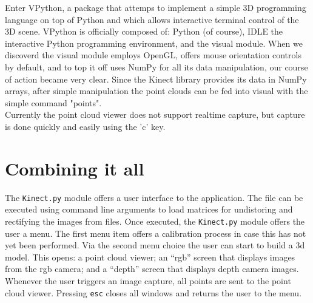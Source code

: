 Enter VPython, a package that attemps to implement a simple 3D programming
language on top of Python and which allows interactive terminal control of the
3D scene. VPython is officially composed of: Python (of course), IDLE the
interactive Python programming environment, and the visual module. When we
discoverd the visual module employs OpenGL, offers mouse orientation controls by
default, and to top it off uses NumPy for all its data manipulation, our course
of action became very clear. Since the Kinect library provides its data in NumPy
arrays, after simple manipulation the point clouds can be fed into visual with
the simple command "points".\\

Currently the point cloud viewer does not support realtime capture, but capture
is done quickly and easily using the 'c' key.\\


\section{Combining it all}


The \texttt{Kinect.py} module offers a user interface to the application. The
file can be executed using command line arguments to load matrices for
undistoring and rectifying the images from files. Once executed, the
\texttt{Kinect.py} module offers the user a menu. The first menu item offers a
calibration process in case this has not yet been performed. Via the second
menu choice the user can start to build a 3d model. This opens: a point cloud
viewer; an ``rgb'' screen that displays images from the rgb camera; and a
``depth'' screen that displays depth camera images. Whenever the user triggers
an image capture, all points are sent to the point cloud viewer. Pressing
\texttt{esc} closes all windows and returns the user to the menu.
